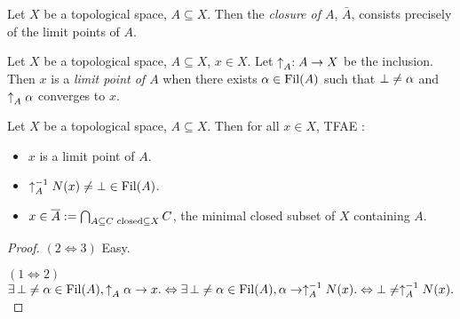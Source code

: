 \documentclass[main.tex]{subfiles}
\begin{document}
\begin{rmk} 
  
  Let $X$ be a topological space, $A \subseteq X$.
  Then the \emph{closure of $A$}, $\bar{A}$,
  consists precisely of the limit points of $A$.
\end{rmk}

\begin{dfn} 

  Let $X$ be a topological space, $A \subseteq X$, $x \in X$.
  Let $\uparrow_{A}^{} : A \to X$ be the inclusion. 
  Then $x$ is a \emph{limit point of $A$} when
  there exists $\alpha \in \operatorname{Fil}(A)$ such that 
  $\bot \neq \alpha$ and $\uparrow_{A}^{} \alpha$ converges to $x$.

\end{dfn}

\begin{prop} 
  
  Let $X$ be a topological space, $A \subseteq X$.
  Then for all $x \in X$, TFAE : 
  \begin{itemize}
    \item $x$ is a limit point of $A$.
    \item $\uparrow_{A}^{-1} N(x) \neq \bot \in \operatorname{Fil}(A)$.
    \item $x \in \overline{A} := \bigcap_{A \subseteq C \text{ closed} \subseteq X} C$,
    the minimal closed subset of $X$ containing $A$.
  \end{itemize}
\end{prop}
\begin{proof}

  $(2 \iff 3)$ Easy. 
  
  $(1 \iff 2)$ $
    \exists\, \bot \neq \alpha \in \operatorname{Fil}(A),\uparrow_{A}^{}\alpha \to x. 
    \Leftrightarrow \exists\, \bot \neq \alpha \in \operatorname{Fil}(A), \alpha \to \uparrow_{A}^{-1}N(x).
    \Leftrightarrow \bot \neq \uparrow_{A}^{-1}N(x). 
  $
  
  
\end{proof}
\end{document}
